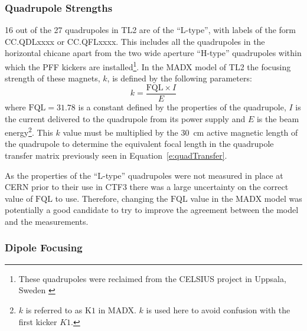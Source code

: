 \subsubsection{Quadrupole Strengths}
\label{sss:quadStrengths}

16 out of the 27 quadrupoles in TL2 are of the ``L-type'', with labels of the form CC.QDLxxxx or CC.QFLxxxx. This includes all the quadrupoles in the horizontal chicane apart from the two wide aperture ``H-type'' quadrupoles within which the PFF kickers are installed\footnote{These quadrupoles were reclaimed from the CELSIUS project in Uppsala, Sweden \cite{celsius}}. In the MADX model of TL2 the focusing strength of these magnets, \(k\), is defined by the following parameters:
\begin{equation}
k = \frac{\mathrm{FQL}\times I}{E}
\end{equation}
where \(\mathrm{FQL} = 31.78\) is a constant defined by the properties of the quadrupole, \(I\) is the current delivered to the quadrupole from its power supply and \(E\) is the beam energy\footnote{\(k\) is referred to as \(\mathrm{K1}\) in MADX. \(k\) is used here to avoid confusion with the first kicker \(K1\).}. 
This \(k\) value must be multiplied by the 30~cm active magnetic length of the quadrupole to determine the equivalent focal length in the quadrupole transfer matrix previously seen in Equation~\ref{e:quadTransfer}.

As the properties of the ``L-type'' quadrupoles were not measured in place at CERN prior to their use in CTF3 there was a large uncertainty on the correct value of \(\mathrm{FQL}\) to use. Therefore, changing the \(\mathrm{FQL}\) value in the MADX model was potentially a good candidate to try to improve the agreement between the model and the measurements.

\subsubsection{Dipole Focusing}
\label{sss:edgeFocusing}

